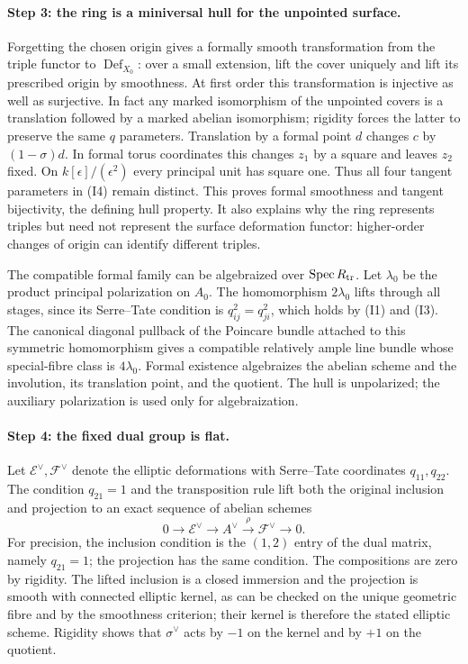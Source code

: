 \paragraph{Step 3: the ring is a miniversal hull for the unpointed surface.}
Forgetting the chosen origin gives a formally smooth transformation
from the triple functor to $\operatorname{Def}_{X_0}$: over a small
extension, lift the cover uniquely and lift its prescribed origin by
smoothness. At first order this transformation is injective as well
as surjective. In fact any marked isomorphism of the unpointed covers
is a translation followed by a marked abelian isomorphism; rigidity
forces the latter to preserve the same $q$ parameters. Translation
by a formal point $d$ changes $c$ by $(1-\sigma)d$. In formal torus
coordinates this changes $z_1$ by a square and leaves $z_2$ fixed.
On $k[\epsilon]/(\epsilon^2)$ every principal unit has square one.
Thus all four tangent parameters in (I4) remain distinct. This proves
formal smoothness and tangent bijectivity, the defining hull property.
It also explains why the ring represents triples but need not represent
the surface deformation functor: higher-order changes of origin can
identify different triples.

The compatible formal family can be algebraized over
$\operatorname{Spec}R_{\rm tr}$. Let $\lambda_0$ be the product principal
polarization on $A_0$. The homomorphism $2\lambda_0$ lifts through all
stages, since its Serre--Tate condition is $q_{ij}^2=q_{ji}^2$, which
holds by (I1) and (I3). The canonical diagonal pullback of the
Poincare bundle attached to this symmetric homomorphism gives a
compatible relatively ample line bundle whose special-fibre class is
$4\lambda_0$. Formal existence algebraizes the abelian scheme and
the involution, its translation point, and the quotient. The hull is
unpolarized; the auxiliary polarization is used only for algebraization.

\paragraph{Step 4: the fixed dual group is flat.}
Let $\mathcal E^\vee,\mathcal F^\vee$ denote the elliptic deformations
with Serre--Tate coordinates $q_{11},q_{22}$. The condition $q_{21}=1$
and the transposition rule lift both the original inclusion and projection
to an exact sequence of abelian schemes
\[
 0\longrightarrow\mathcal E^\vee\longrightarrow A^\vee
 \stackrel{\rho}{\longrightarrow}\mathcal F^\vee
 \longrightarrow0.                                      \tag{I5}
\]
For precision, the inclusion condition is the $(1,2)$ entry of the
dual matrix, namely $q_{21}=1$; the projection has the same condition.
The compositions are zero by rigidity. The lifted inclusion is a closed
immersion and the projection is smooth with connected elliptic kernel,
as can be checked on the unique geometric fibre and by the smoothness
criterion; their kernel is therefore the stated elliptic scheme.
Rigidity shows that $\sigma^\vee$ acts by $-1$ on the kernel and by
$+1$ on the quotient.

